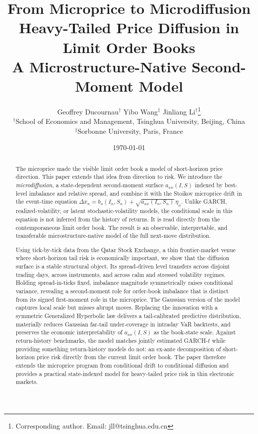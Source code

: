 \documentclass[11pt]{article}
\title{\bfseries From Microprice to Microdiffusion\\[0.2em]
Heavy-Tailed Price Diffusion in Limit Order Books\\[0.35em]
{\large A Microstructure-Native Second-Moment Model}}
\author{%
Geoffrey Ducournau$^{\dag}$
\quad Yibo Wang$^{\ddag}$
\quad Jinliang Li$^{\dag}$\thanks{Corresponding author. Email: jll@tsinghua.edu.cn}\\[0.5em]
\small $^\dag$School of Economics and Management, Tsinghua University, Beijing, China\\
\small $^{\ddag}$Sorbonne University, Paris, France
}
\date{\today}
\theoremstyle{plain}
\theoremstyle{definition}
\newcommand{\axx}{a_{xx}}
\begin{document}
\maketitle

\begin{abstract}
\noindent
The microprice made the visible limit order book a model of short-horizon price
direction. This paper extends that idea from direction to risk. We introduce the
\emph{microdiffusion}, a state-dependent second-moment surface $\axx(I,S)$ indexed by
best-level imbalance and relative spread, and combine it with the Stoikov microprice
drift in the event-time equation
$\Delta x_n=b_x(I_n,S_n)+\sqrt{\axx(I_n,S_n)}\,\eta_n$. Unlike GARCH, realized-volatility,
or latent stochastic-volatility models, the conditional scale in this equation is not
inferred from the history of returns. It is read directly from the contemporaneous
limit order book. The result is an observable, interpretable, and transferable
microstructure-native model of the full next-move distribution.

Using tick-by-tick data from the Qatar Stock Exchange, a thin frontier-market venue
where short-horizon tail risk is economically important, we show that the diffusion
surface is a stable structural object. Its spread-driven level transfers across
disjoint trading days, across instruments, and across calm and stressed volatility
regimes. Holding spread-in-ticks fixed, imbalance magnitude symmetrically raises
conditional variance, revealing a second-moment role for order-book imbalance that is
distinct from its signed first-moment role in the microprice. The Gaussian version of
the model captures local scale but misses abrupt moves. Replacing the innovation with
a symmetric Generalized Hyperbolic law delivers a tail-calibrated predictive
distribution, materially reduces Gaussian far-tail under-coverage in intraday VaR
backtests, and preserves the economic interpretability of $\axx(I,S)$ as the book-state
scale. Against return-history
benchmarks, the model matches jointly estimated GARCH-$t$ while providing something
return-history models do not: an ex-ante decomposition of short-horizon price risk
directly from the current limit order book. The paper therefore extends the microprice
program from conditional drift to conditional diffusion and provides a practical
state-indexed model for heavy-tailed price risk in thin electronic markets.
\end{abstract}
\end{document}
